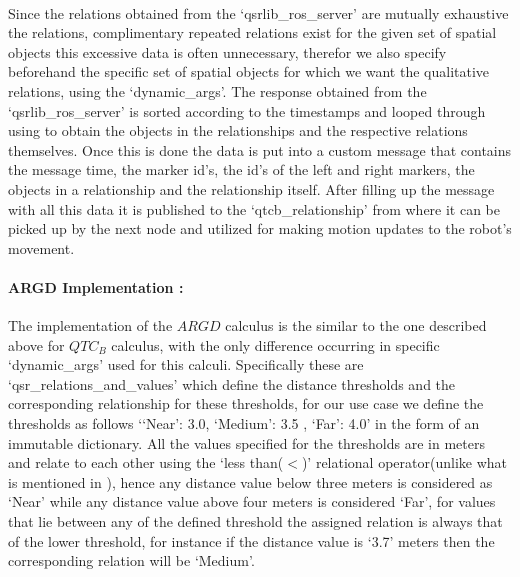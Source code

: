 \paragraph{} Since the relations obtained from the `qsrlib\_ros\_server' are mutually exhaustive the relations, complimentary repeated relations exist for the given set of spatial objects this excessive data is often unnecessary, therefor we also specify beforehand the specific set of spatial objects for which we want the qualitative relations, using the `dynamic\_args'. The response obtained from the `qsrlib\_ros\_server' is sorted according to the timestamps and looped through using to obtain the objects in the relationships and the respective relations themselves. Once this is done the data is put into a custom message that contains the message time, the marker id's, the id's of the left and right markers, the objects in a relationship and the relationship itself. After filling up the message with all this data it is published to the `qtcb\_relationship' from where it can be picked up by the next node and utilized for making motion updates to the robot's movement.

\paragraph{ARGD Implementation :} The implementation of the $ARGD$ calculus is the similar to the one described above for  $QTC_B$ calculus, with the only difference occurring in specific `dynamic\_args' used for this calculi. Specifically these are `qsr\_relations\_and\_values' which define the distance thresholds and the corresponding relationship for these thresholds, for our use case we define the thresholds as follows `{`Near': 3.0, `Medium': 3.5 , `Far': 4.0}' in the form of an immutable dictionary. All the values specified for the thresholds are in meters and relate to each other using the `less than($<$)' relational operator(unlike what is mentioned in \cite{gatsoulis2016qsrlib}), hence any distance value below three meters is considered as `Near' while any distance value above four meters is considered `Far', for values that lie between any of the defined threshold the assigned relation is always that of the lower threshold, for instance if the distance value is `3.7' meters then the corresponding relation will be `Medium'.

